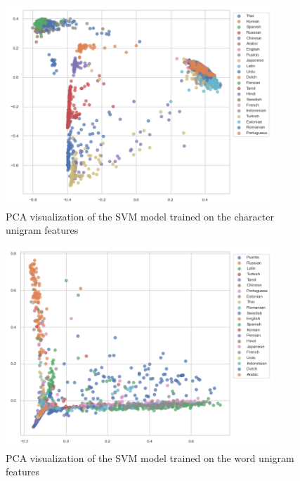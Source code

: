 \begin{figure}
    \centering
    \includegraphics[width=0.9\textwidth]{figures/svm_char_unigram_val_set_pca.png}
    \caption{PCA visualization of the SVM model trained on the character unigram features}
    \label{fig:pca_svm_char_unigram}
\end{figure}

\begin{figure}
    \centering
    \includegraphics[width=0.9\textwidth]{figures/svm_word_unigram_val_set_pca.png}
    \caption{PCA visualization of the SVM model trained on the word unigram features}
    \label{fig:pca_svm_word_unigram}
\end{figure}


